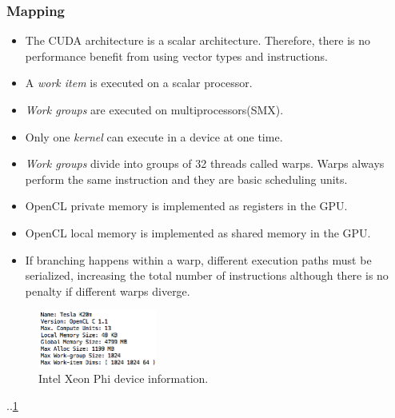 \subsubsection{Mapping}
\begin{itemize}
    \item The CUDA architecture is a scalar architecture. Therefore, there is no performance benefit from using vector types and 
        instructions\cite{gpu_opencl_cuda}.
    \item A \emph{work item} is executed on a scalar processor\cite{gpu_opencl_opt_slides}.
    \item \emph{Work groups} are executed on multiprocessors(SMX)\cite{gpu_opencl_opt_slides}.
    \item Only one \emph{kernel} can execute in a device at one time\cite{gpu_opencl_opt_slides}.
    \item \emph{Work groups} divide into groups of 32 threads called warps. Warps always perform the same instruction and they
        are basic scheduling units\cite{gpu_opencl_opt_slides}.
    \item OpenCL private memory is implemented as registers in the GPU\cite{gpu_opencl_opt_slides}.
    \item OpenCL local memory is implemented as shared memory in the GPU\cite{gpu_opencl_opt_slides}.
    \item If branching happens within a warp, different execution paths must be serialized, increasing the total number of 
        instructions although there is no penalty if different warps diverge\cite{gpu_opencl_opt_slides}.
\end{itemize}

\begin{figure}[!h]
    \centering
    \includegraphics[width=0.35\textwidth]{figures/gpu_device_info.png}
    \caption{Intel Xeon Phi device information.}
    \label{GpuDeviceInfo}
\end{figure}

\par{..\cite{gpu_specs1}\ref{GpuDeviceInfo}\cite{gpu_opencl_cuda}}




